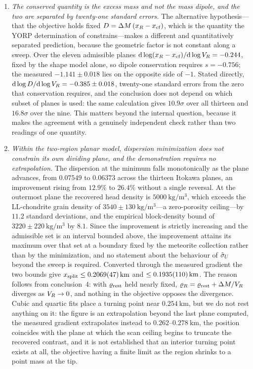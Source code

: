 \begin{enumerate}
\item \emph{The conserved quantity is the excess mass and not the mass
dipole, and the two are separated by twenty-one standard errors.} The
alternative hypothesis---that the objective holds fixed
$D = \Delta M\,(x_R-x_{\mathrm{cf}})$, which is the quantity the YORP
determination of \citet{lowry2014} constrains---makes a different and
quantitatively separated prediction, because the geometric factor is not
constant along a sweep. Over the eleven admissible planes
$\mathrm{d}\log(x_R-x_{\mathrm{cf}})/\mathrm{d}\log V_{R} = -0.244$, fixed by
the shape model alone, so dipole conservation requires $s = -0.756$; the
measured $-1.141 \pm 0.018$ lies on the opposite side of $-1$. Stated
directly, $\mathrm{d}\log D/\mathrm{d}\log V_{R} = -0.385 \pm 0.018$,
twenty-one standard errors from the zero that conservation requires, and
the conclusion does not depend on which subset of planes is used: the same
calculation gives $10.9\sigma$ over all thirteen and $16.8\sigma$ over the
nine. This matters beyond the internal question, because it makes the
agreement with \citet{lowry2014} a genuinely independent check rather than
two readings of one quantity.

\item \emph{Within the two-region planar model, dispersion minimization
does not constrain its own dividing plane, and the demonstration requires
no extrapolation.} The dispersion at the minimum falls monotonically as
the plane advances, from $0.07549$ to $0.06373$ across the thirteen
Itokawa planes, an improvement rising from $12.9\%$ to $26.4\%$ without a
single reversal. At the outermost plane the recovered head density is
$\SI{5000}{\kilo\gram\per\cubic\metre}$, which exceeds the LL-chondrite
grain density of $3540 \pm \SI{130}{\kilo\gram\per\cubic\metre}$---a
zero-porosity ceiling---by $11.2$ standard deviations, and the empirical
block-density bound of $3220 \pm \SI{220}{\kilo\gram\per\cubic\metre}$ by
$8.1$. Since the improvement is strictly increasing and the admissible set
is an interval bounded above, the improvement attains its maximum over
that set at a boundary fixed by the meteorite collection rather than by
the minimization, and no statement about the behaviour of $\tilde{\sigma}_{U}$
beyond the sweep is required. Converted through the measured gradient the
two bounds give $x_{\mathrm{split}} \le \SI{0.2069+-0.0047}{\kilo\metre}$ and
$\le \SI{0.1935+-0.0110}{\kilo\metre}$. The reason follows from
conclusion~4: with $\varrho_{\mathrm{rest}}$ held nearly fixed,
$\varrho_{R} = \varrho_{\mathrm{rest}} + \Delta M/V_{R}$ diverges as $V_{R} \to 0$, and nothing in
the objective opposes the divergence. Cubic and quartic fits place a
turning point near $\SI{0.254}{\kilo\metre}$, but we do not rest anything
on it: the figure is an extrapolation beyond the last plane computed, the
measured gradient extrapolates instead to $0.262$--$\SI{0.278}{\kilo
\metre}$, the position coincides with the plane at which the scan ceiling
begins to truncate the recovered contrast, and it is not established that
an interior turning point exists at all, the objective having a finite
limit as the region shrinks to a point mass at the tip.


\end{enumerate}

